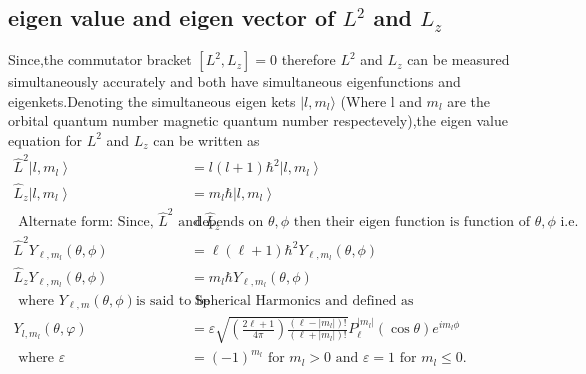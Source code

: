 \subsection{eigen value and eigen vector of $L^2$ and $L_z$}
Since,the commutator bracket $\left[ L^2,L_z\right] =0$ therefore $L^2$ and $L_z$ can be measured simultaneously accurately and both have simultaneous eigenfunctions and eigenkets.Denoting the simultaneous eigen kets $|l,m_l\rangle $ (Where l and $m_l$ are the orbital quantum number magnetic quantum number respectevely),the eigen value equation for $L^2$ and $L_z$ can be written as 
\begin{align*}
\hat{L}^{2}\left|l, m_{l}\right\rangle&=l(l+1) \hbar^{2}\left|l, m_{l}\right\rangle \\
\hat{L}_{z}\left|l, m_{l}\right\rangle&=m_{l} \hbar\left|l, m_{l}\right\rangle\\
\text { Alternate form: Since, } \hat{L}^{2} \text { and } \hat{L}_{z} &\text { depends on } \theta, \phi \text { then their eigen function is function of } \theta, \phi \text { i.e. }\\
\hat{L}^{2} Y_{\ell, m_{l}}(\theta, \phi)&=\ell(\ell+1) \hbar^{2} Y_{\ell, m_{l}}(\theta, \phi) \\
\hat{L}_{z} Y_{\ell, m_{l}}(\theta, \phi)&=m_{l} \hbar Y_{\ell, m_{l}}(\theta, \phi)\\
\text { where } Y_{\ell, m}(\theta, \phi) \text{is said to be}&\text {  Spherical Harmonics and defined as }\\
Y_{l, m_{l}}(\theta, \varphi)&=\varepsilon \sqrt{\left(\frac{2 \ell+1}{4 \pi}\right) \frac{\left(\ell-\left|m_{l}\right|\right) !}{\left(\ell+\left|m_{l}\right|\right) !}} P_{\ell}^{\left|m_{l}\right|}(\cos \theta) e^{i m_{l} \phi}\\
\text { where } \varepsilon&=(-1)^{m_{l}} \text { for } m_{l}>0 \text { and } \varepsilon=1 \text { for } m_{l} \leq 0 \text {. }
\end{align*}
